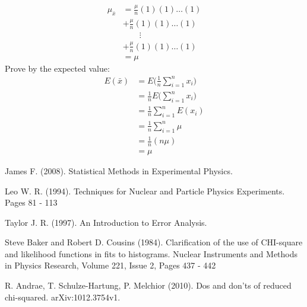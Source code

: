 \documentclass[12pt,a4paper]{report}
\begin{document}
\begin{align*}
\mu_{\bar{x}}
&= \frac{\mu}{n} (1) (1) \dots (1) \\
&+ \frac{\mu}{n} (1) (1) \dots (1) \\
& \qquad \vdots \\
&+ \frac{\mu}{n} (1) (1) \dots (1) \\
&= \mu
\end{align*}
Prove by the expected value:
\begin{align*}
E(\bar{x})
&= E \Bigg( \frac{1}{n} \sum_{i=1}^n x_i \Bigg) \\
&= \frac{1}{n} E \Bigg( \sum_{i=1}^n x_i \Bigg) \\
&= \frac{1}{n} \sum_{i=1}^n E(x_i) \\
&= \frac{1}{n} \sum_{i=1}^n \mu \\
&= \frac{1}{n} (n \mu) \\
&= \mu
\end{align*}

\medskip

\begin{thebibliography}{99}

James F. (2008). Statistical Methods in Experimental Physics.

Leo W. R. (1994). Techniques for Nuclear and Particle Physics Experiments. Pages 81 - 113

Taylor J. R. (1997). An Introduction to Error Analysis. 

Steve Baker and Robert D. Cousins (1984). Clarification of the use of CHI-square and likelihood functions in fits to histograms. Nuclear Instruments and Methods in Physics Research, Volume 221, Issue 2, Pages 437 - 442 

R. Andrae, T. Schulze-Hartung, P. Melchior (2010). Dos and don’ts of reduced chi-squared. arXiv:1012.3754v1. 

\end{thebibliography}
\end{document}
